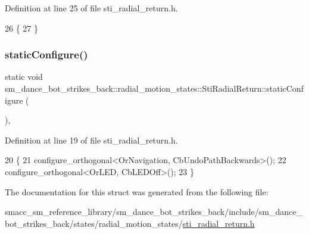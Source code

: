 Definition at line 25 of file sti\+\_\+radial\+\_\+return.\+h.


\begin{DoxyCode}
26   \{
27   \}
\end{DoxyCode}
\mbox{\label{structsm__dance__bot__strikes__back_1_1radial__motion__states_1_1StiRadialReturn_ab6a28934e740e83fd282f8a27204a080}} 
\subsubsection{\texorpdfstring{static\+Configure()}{staticConfigure()}}
{\footnotesize\ttfamily static void sm\+\_\+dance\+\_\+bot\+\_\+strikes\+\_\+back\+::radial\+\_\+motion\+\_\+states\+::\+Sti\+Radial\+Return\+::static\+Configure (\begin{DoxyParamCaption}{ }\end{DoxyParamCaption})\hspace{0.3cm}{\ttfamily [inline]}, {\ttfamily [static]}}



Definition at line 19 of file sti\+\_\+radial\+\_\+return.\+h.


\begin{DoxyCode}
20   \{
21     configure\_orthogonal<OrNavigation, CbUndoPathBackwards>();
22     configure\_orthogonal<OrLED, CbLEDOff>();
23   \}
\end{DoxyCode}


The documentation for this struct was generated from the following file\+:\begin{DoxyCompactItemize}
\item 
smacc\+\_\+sm\+\_\+reference\+\_\+library/sm\+\_\+dance\+\_\+bot\+\_\+strikes\+\_\+back/include/sm\+\_\+dance\+\_\+bot\+\_\+strikes\+\_\+back/states/radial\+\_\+motion\+\_\+states/\hyperlink{strikes__back_2include_2sm__dance__bot__strikes__back_2states_2radial__motion__states_2sti__radial__return_8h}{sti\+\_\+radial\+\_\+return.\+h}\end{DoxyCompactItemize}
